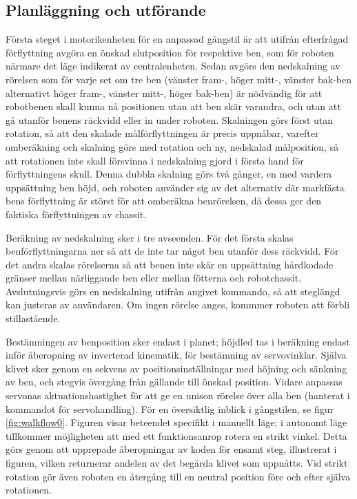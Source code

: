 \documentclass[a4paper,titlepage,12pt]{article}
\begin{document}
		\subsection{Planläggning och utförande}
	Första steget i motorikenheten för en anpassad gångstil är att utifrån efterfrågad
	förflyttning avgöra en önskad slutposition för respektive ben, som för roboten närmare 
	det läge indikerat av centralenheten. Sedan avgörs den nedskalning av rörelsen som för 
	varje set om tre ben (vänster fram-, höger mitt-, vänster bak-ben alternativt höger fram-, 
	vänster mitt-, höger bak-ben) är nödvändig för att robotbenen skall kunna nå positionen utan att ben 
        skär varandra, och utan att gå utanför benens räckvidd eller in under roboten. Skalningen 
        görs först utan rotation, så att den skalade målförflyttningen är precis uppnåbar, varefter omberäkning 
        och skalning görs med rotation och ny, nedskalad målposition, så att rotationen inte skall 
        försvinna i nedskalning gjord i första hand för förflyttningens skull. Denna dubbla skalning 
        görs två gånger, en med vardera uppsättning ben höjd, och roboten använder sig av det 
        alternativ där markfästa bens förflyttning är störst för att omberäkna benrörelsen, då dessa 
        ger den faktiska förflyttningen av chassit. 

	Beräkning av nedskalning sker i tre avseenden. För det första skalas benförflyttningarna 
	ner så att de inte tar något ben utanför dess räckvidd. För det andra skalas  rörelserna så 
	att benen inte skär en uppsättning hårdkodade gränser mellan närliggande ben eller mellan 
	fötterna och robotchassit. Avslutningsvis görs en nedskalning utifrån angivet kommando, så 
	att steglängd kan justeras av användaren. Om ingen rörelse anges, kommmer roboten att förbli 
	stillastående.

	Bestämningen av benposition sker endast i planet; höjdled tas i beräkning endast inför åberopning 
	av inverterad kinematik, för bestämning av servovinklar. Själva klivet sker genom en sekvens av 
	positionsinställningar med höjning och sänkning av ben, och stegvis övergång från gällande till 
	önskad position. Vidare anpassas servonas aktuationshastighet för att ge en unison rörelse 
	över alla ben (hanterat i kommandot för servohandling). För en översiktlig inblick i 
	gångstilen, se figur \ref{fig:walkflow0}. Figuren visar beteendet specifikt i manuellt läge;
	i autonomt läge tillkommer möjligheten att med ett funktionsanrop rotera en strikt vinkel.
	Detta görs genom att upprepade åberopningar av koden för ensamt steg, illustrerat i figuren, 
	vilken returnerar andelen av det begärda klivet som uppnåtts. Vid strikt rotation gör även 
	roboten en återgång till en neutral position före och efter själva rotationen.
	
\end{document}
